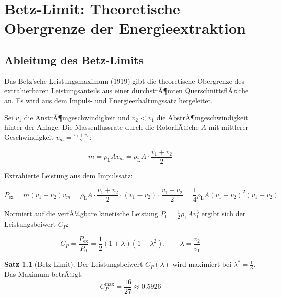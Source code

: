 ﻿\documentclass[12pt, a4paper]{report}
\theoremstyle{definition}
\newtheorem{theorem}{Satz}[section]
\theoremstyle{remark}
\newcommand{\rhoL}{\rho_{\text{L}}}
\begin{document}
\chapter{Betz-Limit: Theoretische Obergrenze der Energieextraktion}
\label{chap:betz}

\section{Ableitung des Betz-Limits}

Das Betz'sche Leistungsmaximum (1919) gibt die theoretische Obergrenze des
extrahierbaren Leistungsanteils aus einer durchstrÃ¶mten QuerschnittsflÃ¤che an.
Es wird aus dem Impuls- und Energieerhaltungssatz hergeleitet.

Sei $v_1$ die AnstrÃ¶mgeschwindigkeit und $v_2 < v_1$ die AbstrÃ¶mgeschwindigkeit
hinter der Anlage. Die Massenflussrate durch die RotorflÃ¤che $A$ mit
mittlerer Geschwindigkeit $v_m = \frac{v_1+v_2}{2}$:

\begin{equation}
  \dot{m} = \rhoL A v_m = \rhoL A \cdot \frac{v_1 + v_2}{2}
  \label{eq:massenstrom}
\end{equation}

Extrahierte Leistung aus dem Impulssatz:

\begin{equation}
  P_{\text{ex}} = \dot{m}(v_1 - v_2)v_m
  = \rhoL A \cdot \frac{v_1+v_2}{2} \cdot (v_1-v_2) \cdot \frac{v_1+v_2}{2}
  = \frac{1}{4}\rhoL A (v_1+v_2)^2(v_1-v_2)
  \label{eq:p_betz}
\end{equation}

Normiert auf die verfÃ¼gbare kinetische Leistung $P_0 = \frac{1}{2}\rhoL A v_1^3$
ergibt sich der Leistungsbeiwert $C_P$:

\begin{equation}
  C_P = \frac{P_{\text{ex}}}{P_0} = \frac{1}{2}(1+\lambda)(1-\lambda^2),
  \qquad \lambda = \frac{v_2}{v_1}
  \label{eq:cp}
\end{equation}

\begin{theorem}[Betz-Limit]
  \label{thm:betz}
  Der Leistungsbeiwert $C_P(\lambda)$ wird maximiert bei
  $\lambda^* = \frac{1}{3}$. Das Maximum betrÃ¤gt:
  \begin{equation}
    C_P^{\max} = \frac{16}{27} \approx 0.5926
    \label{eq:betz_max}
  \end{equation}
\end{theorem}
\end{document}
